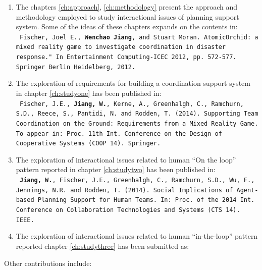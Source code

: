 \begin{enumerate}
\item The chapters \ref{ch:approach}, \ref{ch:methodology}  present the approach and methodology employed to study interactional issues of planning support system. Some of the ideas of these chapters expands on the contents in:\\
\texttt{ \footnotesize Fischer, Joel E., \textbf{Wenchao Jiang}, and Stuart Moran. AtomicOrchid: a mixed reality game to investigate coordination in disaster response." In Entertainment Computing-ICEC 2012, pp. 572-577. Springer Berlin Heidelberg, 2012.}\\

\item The exploration of requirements for building a coordination support system in chapter \ref{ch:studyone}  has been published in:\\
\texttt{ \footnotesize Fischer, J.E., \textbf{Jiang, W.}, Kerne, A., Greenhalgh, C., Ramchurn, S.D., Reece, S., Pantidi, N. and Rodden, T. (2014). Supporting Team Coordination on the Ground: Requirements from a Mixed Reality Game. To appear in: Proc. 11th Int. Conference on the Design of Cooperative Systems (COOP 14). Springer.}\\


\item The exploration of interactional issues related to human ``On the loop'' pattern reported in chapter \ref{ch:studytwo} has been published in:\\
\texttt{ \footnotesize\textbf{Jiang, W.}, Fischer, J.E., Greenhalgh, C., Ramchurn, S.D., Wu, F., Jennings, N.R. and Rodden, T. (2014). Social Implications of Agent-based Planning Support for Human Teams.  In: Proc. of the 2014 Int. Conference on Collaboration Technologies and Systems (CTS 14). IEEE.}

\item The exploration of interactional issues related to human ``in-the-loop'' pattern reported chapter \ref{ch:studythree} has been submitted as:\\



\end{enumerate}

Other contributions include:

